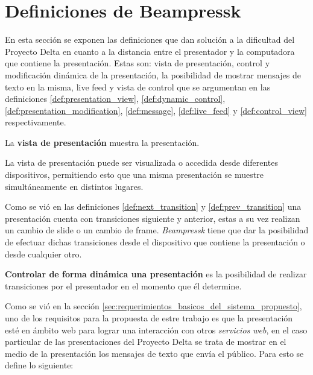 	\section{Definiciones de Beampressk} %
	\label{sec:definiciones_de_beampressk}

		 En esta sección se exponen las definiciones que dan solución a la dificultad del Proyecto Delta en cuanto a la distancia entre el presentador y la computadora que contiene la presentación. Estas son: vista de presentación, control y modificación dinámica de la presentación, la posibilidad de mostrar mensajes de texto en la misma, live feed y vista de control que se argumentan en las definiciones \ref{def:presentation_view}, \ref{def:dynamic_control}, \ref{def:presentation_modification}, \ref{def:message}, \ref{def:live_feed} y \ref{def:control_view} respectivamente. %

		\begin{definition}
		\label{def:presentation_view}
			La \textbf{vista de presentación} muestra la presentación. 
		\end{definition}

		La vista de presentación puede ser visualizada o accedida desde diferentes dispositivos, permitiendo esto que una misma presentación se muestre simultáneamente en distintos lugares.

		Como se vió en las definiciones \ref{def:next_transition} y \ref{def:prev_transition} una presentación cuenta con transiciones siguiente y anterior, estas a su vez realizan un cambio de slide o un cambio de frame. \textit{Beampressk} tiene que dar la posibilidad de efectuar dichas transiciones desde el dispositivo que contiene la presentación o desde cualquier otro.


		\begin{definition}
		\label{def:dynamic_control}
			\textbf{Controlar de forma dinámica una presentación} es la posibilidad de realizar transiciones por el presentador en el momento que él determine.
		\end{definition}



		Como se vió en la sección \ref{sec:requerimientos_basicos_del_sistema_propuesto}, uno de los requisitos para la propuesta de estre trabajo es que la presentación esté en ámbito web para lograr una interacción con otros \textit{servicios web}, en el caso particular de las presentaciones del Proyecto Delta se trata de mostrar en el medio de la presentación los mensajes de texto que envía el público. Para esto se define lo siguiente: 

